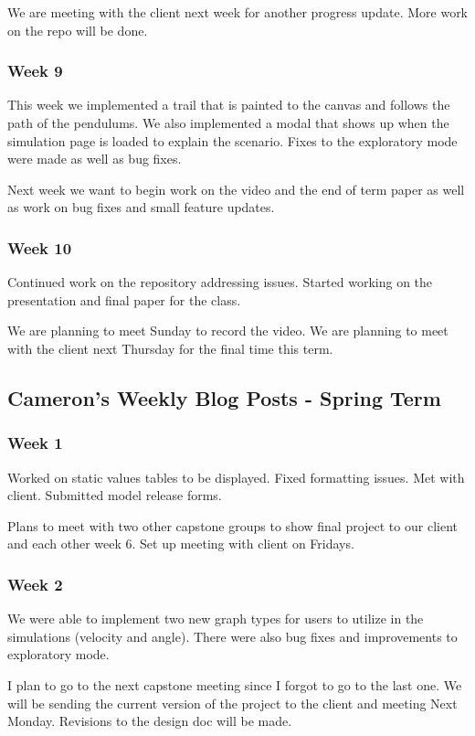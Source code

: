 We are meeting with the client next week for another progress update. More work on the repo will be done.

\subsubsection{Week 9}
This week we implemented a trail that is painted to the canvas and follows the path of the pendulums. We also implemented a modal that shows up when the simulation page is loaded to explain the scenario. Fixes to the exploratory mode were made as well as bug fixes.

Next week we want to begin work on the video and the end of term paper as well as work on bug fixes and small feature updates.

\subsubsection{Week 10}
Continued work on the repository addressing issues. Started working on the presentation and final paper for the class.

We are planning to meet Sunday to record the video. We are planning to meet with the client next Thursday for the final time this term.

\subsection{Cameron's Weekly Blog Posts - Spring Term}

\subsubsection{Week 1}
Worked on static values tables to be displayed. Fixed formatting issues. Met with client. Submitted model release forms. 

Plans to meet with two other capstone groups to show final project to our client and each other week 6. Set up meeting with client on Fridays. 

\subsubsection{Week 2}
We were able to implement two new graph types for users to utilize in the simulations (velocity and angle). There were also bug fixes and improvements to exploratory mode.

I plan to go to the next capstone meeting since I forgot to go to the last one. We will be sending the current version of the project to the client and meeting Next Monday. Revisions to the design doc will be made.

